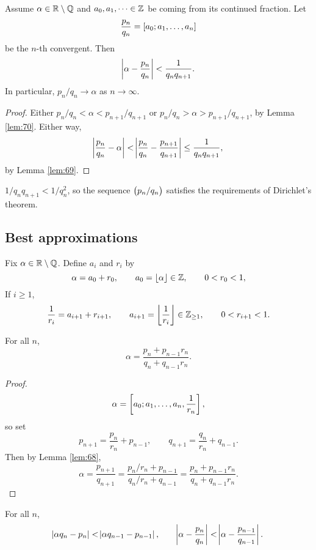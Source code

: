 \begin{corollary}
Assume $ \alpha \in \mathbb{R} \setminus \mathbb{Q} $ and $ a_0, a_1, \dots \in \mathbb{Z} $ be coming from its continued fraction. Let
$$ \dfrac{p_n}{q_n} = \sbr{a_0; a_1, \dots, a_n} $$
be the $ n $-th convergent. Then
$$ \abs{\alpha - \dfrac{p_n}{q_n}} < \dfrac{1}{q_nq_{n + 1}}. $$
In particular, $ p_n / q_n \to \alpha $ as $ n \to \infty $.
\end{corollary}

\begin{proof}
Either $ p_n / q_n < \alpha < p_{n + 1} / q_{n + 1} $ or $ p_n / q_n > \alpha > p_{n + 1} / q_{n + 1} $, by Lemma \ref{lem:70}. Either way,
$$ \abs{\dfrac{p_n}{q_n} - \alpha} < \abs{\dfrac{p_n}{q_n} - \dfrac{p_{n + 1}}{q_{n + 1}}} \le \dfrac{1}{q_nq_{n + 1}}, $$
by Lemma \ref{lem:69}.
\end{proof}

\begin{note*}
$ 1 / q_nq_{n + 1} < 1 / q_n^2 $, so the sequence $ \br{p_n / q_n} $ satisfies the requirements of Dirichlet's theorem.
\end{note*}

\pagebreak

\subsection{Best approximations}

Fix $ \alpha \in \mathbb{R} \setminus \mathbb{Q} $. Define $ a_i $ and $ r_i $ by
$$ \alpha = a_0 + r_0, \qquad a_0 = \left\lfloor \alpha \right\rfloor \in \mathbb{Z}, \qquad 0 < r_0 < 1, $$
If $ i \ge 1 $,
$$ \dfrac{1}{r_i} = a_{i + 1} + r_{i + 1}, \qquad a_{i + 1} = \left\lfloor \dfrac{1}{r_i} \right\rfloor \in \mathbb{Z}_{\ge 1}, \qquad 0 < r_{i + 1} < 1. $$

\begin{lemma}
\label{lem:72}
For all $ n $,
$$ \alpha = \dfrac{p_n + p_{n - 1}r_n}{q_n + q_{n - 1}r_n}. $$
\end{lemma}

\begin{proof}
$$ \alpha = \sbr{a_0; a_1, \dots, a_n, \dfrac{1}{r_n}}, $$
so set
$$ p_{n + 1} = \dfrac{p_n}{r_n} + p_{n - 1}, \qquad q_{n + 1} = \dfrac{q_n}{r_n} + q_{n - 1}. $$
Then by Lemma \ref{lem:68},
$$ \alpha = \dfrac{p_{n + 1}}{q_{n + 1}} = \dfrac{p_n / r_n + p_{n - 1}}{q_n / r_n + q_{n - 1}} = \dfrac{p_n + p_{n - 1}r_n}{q_n + q_{n - 1}r_n}. $$
\end{proof}

\begin{corollary}
For all $ n $,
$$ \abs{\alpha q_n - p_n} < \abs{\alpha q_{n - 1} - p_{n - 1}}, \qquad \abs{\alpha - \dfrac{p_n}{q_n}} < \abs{\alpha - \dfrac{p_{n - 1}}{q_{n - 1}}}. $$
\end{corollary}

